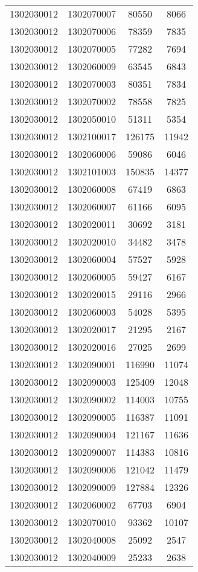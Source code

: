 \begin{longtable}{llcc}
1302030012 & 1302070007 & 80550 & 8066\\
1302030012 & 1302070006 & 78359 & 7835\\
1302030012 & 1302070005 & 77282 & 7694\\
1302030012 & 1302060009 & 63545 & 6843\\
1302030012 & 1302070003 & 80351 & 7834\\
1302030012 & 1302070002 & 78558 & 7825\\
1302030012 & 1302050010 & 51311 & 5354\\
1302030012 & 1302100017 & 126175 & 11942\\
1302030012 & 1302060006 & 59086 & 6046\\
1302030012 & 1302101003 & 150835 & 14377\\
1302030012 & 1302060008 & 67419 & 6863\\
1302030012 & 1302060007 & 61166 & 6095\\
1302030012 & 1302020011 & 30692 & 3181\\
1302030012 & 1302020010 & 34482 & 3478\\
1302030012 & 1302060004 & 57527 & 5928\\
1302030012 & 1302060005 & 59427 & 6167\\
1302030012 & 1302020015 & 29116 & 2966\\
1302030012 & 1302060003 & 54028 & 5395\\
1302030012 & 1302020017 & 21295 & 2167\\
1302030012 & 1302020016 & 27025 & 2699\\
1302030012 & 1302090001 & 116990 & 11074\\
1302030012 & 1302090003 & 125409 & 12048\\
1302030012 & 1302090002 & 114003 & 10755\\
1302030012 & 1302090005 & 116387 & 11091\\
1302030012 & 1302090004 & 121167 & 11636\\
1302030012 & 1302090007 & 114383 & 10816\\
1302030012 & 1302090006 & 121042 & 11479\\
1302030012 & 1302090009 & 127884 & 12326\\
1302030012 & 1302060002 & 67703 & 6904\\
1302030012 & 1302070010 & 93362 & 10107\\
1302030012 & 1302040008 & 25092 & 2547\\
1302030012 & 1302040009 & 25233 & 2638\\

\end{longtable}
